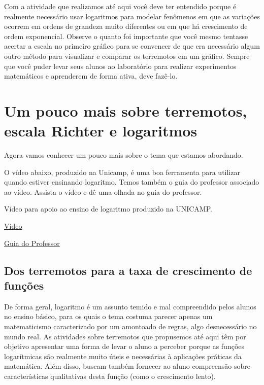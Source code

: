 \documentclass[12pt, a4paper]{article}
\begin{document}
\begin{observacao}
  Com a atividade que realizamos até aqui você deve ter entendido porque é realmente necessário usar logaritmos para modelar fenômenos em que as variações ocorrem em ordens de grandeza muito diferentes ou em que há crescimento de ordem exponencial. Observe o quanto foi importante que você mesmo tentasse acertar a escala no primeiro gráfico para se convencer de que era necessário algum outro método para visualizar e comparar os terremotos em um gráfico. Sempre que você puder levar seus alunos ao laboratório para realizar experimentos matemáticos e aprenderem de forma ativa, deve fazê-lo.
\end{observacao}

\section{Um pouco mais sobre terremotos, escala Richter e logaritmos}

Agora vamos conhecer um pouco mais sobre o tema que estamos abordando.

O vídeo abaixo, produzido na Unicamp, é uma boa ferramenta para utilizar quando estiver ensinando logaritmo. Temos também o guia do professor associado ao vídeo. Assista o vídeo e dê uma olhada no guia do professor.

\begin{observacao}
  Vídeo para apoio ao ensino de logaritmo produzido na UNICAMP.

  \vspace{0.8em}

  \href{https://m3.ime.unicamp.br/recursos/1182}{Vídeo}

  \href{https://graduacao.cederj.edu.br/pluginfile.php/25005/mod_resource/content/1/terremotobrasileiro-guia.pdf}{Guia do Professor}
\end{observacao}

\subsection{Dos terremotos para a taxa de crescimento de funções}

De forma geral, logaritmo é um assunto temido e mal compreendido pelos alunos no ensino básico, para os quais o tema costuma parecer apenas um matematicismo caracterizado por um amontoado de regras, algo desnecessário no mundo real. As atividades sobre terremotos que propusemos até aqui têm por objetivo apresentar uma forma de levar o aluno a perceber porque as funções logarítmicas são realmente muito úteis e necessárias à aplicações práticas da matemática. Além disso, buscam também fornecer ao aluno compreensão sobre características qualitativas desta função (como o crescimento lento).
\end{document}
